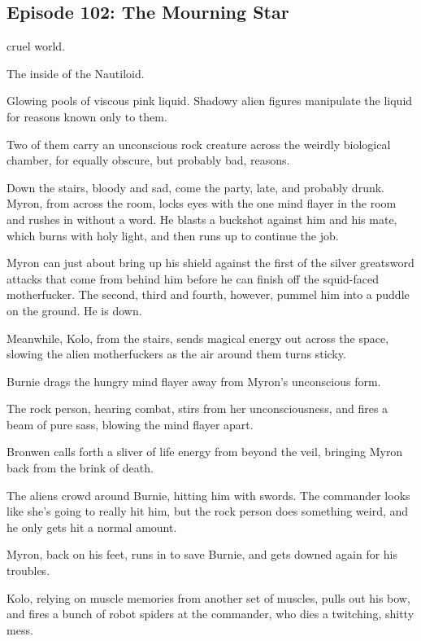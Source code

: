 \subsection{Episode 102: The Mourning Star}

 cruel world.\medskip

The inside of the Nautiloid.\medskip

Glowing pools of viscous pink liquid. Shadowy alien figures manipulate the liquid for reasons known only to them.\medskip

Two of them carry an unconscious rock creature across the weirdly biological chamber, for equally obscure, but probably bad, reasons.\medskip

Down the stairs, bloody and sad, come the party, late, and probably drunk. Myron, from across the room, locks eyes with the one mind flayer in the room and rushes in without a word. He blasts a buckshot against him and his mate, which burns with holy light, and then runs up to continue the job.\medskip

Myron can just about bring up his shield against the first of the silver greatsword attacks that come from behind him before he can finish off the squid-faced motherfucker. The second, third and fourth, however, pummel him into a puddle on the ground. He is down.\medskip

Meanwhile, Kolo, from the stairs, sends magical energy out across the space, slowing the alien motherfuckers as the air around them turns sticky.\medskip

Burnie drags the hungry mind flayer away from Myron’s unconscious form.\medskip

The rock person, hearing combat, stirs from her unconsciousness, and fires a beam of pure sass, blowing the mind flayer apart.\medskip

Bronwen calls forth a sliver of life energy from beyond the veil, bringing Myron back from the brink of death.\medskip

The aliens crowd around Burnie, hitting him with swords. The commander looks like she’s going to really hit him, but the rock person does something weird, and he only gets hit a normal amount.\medskip

Myron, back on his feet, runs in to save Burnie, and gets downed again for his troubles.\medskip

Kolo, relying on muscle memories from another set of muscles, pulls out his bow, and fires a bunch of robot spiders at the commander, who dies a twitching, shitty mess.\medskip

